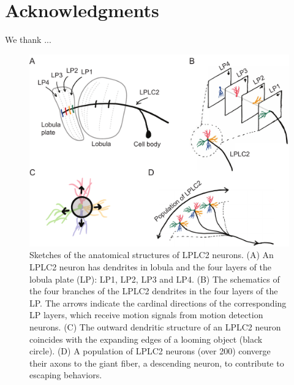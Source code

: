 \documentclass[9pt,lineno]{elife}
\begin{document}
\section{Acknowledgments}

We thank ...




\newpage

\begin{figure}
\includegraphics[width=\linewidth]{figures/anatomy_paper.pdf}
\caption{Sketches of the anatomical structures of LPLC2 neurons. (A) An LPLC2 neuron has dendrites in lobula and the four layers of the lobula plate (LP): LP1, LP2, LP3 and LP4. (B) The schematics of the four branches of the LPLC2 dendrites in the four layers of the LP. The arrows indicate the cardinal directions of the corresponding LP layers, which receive motion signals from motion detection neurons. (C) The outward dendritic structure of an LPLC2 neuron coincides with the expanding edges of a looming object (black circle). (D) A population of LPLC2 neurons (over 200) converge their axons to the giant fiber, a descending neuron, to contribute to escaping behaviors.}
\label{fig:anatomy}
\end{figure}
\end{document}

